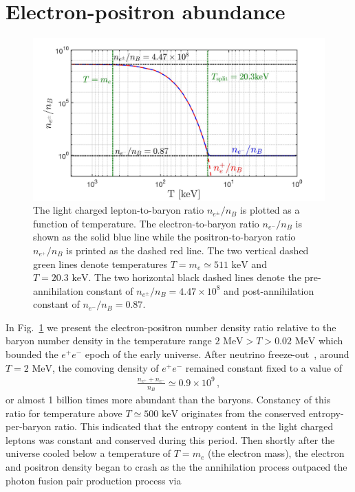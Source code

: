 \documentclass[a4paper]{article}
\newcommand*{\MeV}{\text{ MeV}}
\newcommand*{\keV}{\text{ keV}}
\newcommand{\rf}[1]{Fig.~{\ref{#1}}}
\begin{document}
\section{Electron-positron abundance}\label{sec:abundance}
\begin{figure}[h]
    \centering
    \includegraphics[width=\textwidth]{EEPlasmaDensityRatio.jpg}
    \caption{The light charged lepton-to-baryon ratio $n_{e^{\pm}}/n_{B}$ is plotted as a function of temperature. The electron-to-baryon ratio $n_{e^{-}}/n_{B}$ is shown as the solid blue line while the positron-to-baryon ratio $n_{e^{+}}/n_{B}$ is printed as the dashed red line. The two vertical dashed green lines denote temperatures $T=m_{e}\simeq511\keV$ and $T=20.3\keV$. The two horizontal black dashed lines denote the pre-annihilation constant of $n_{e^{\pm}}/n_{B}=4.47\times10^{8}$ and post-annihilation constant of $n_{e^{-}}/n_{B}=0.87$.}
    \label{DensityRatio} 
\end{figure}
\noindent In \rf{DensityRatio} we present the electron-positron number density ratio relative to the baryon number density in the temperature range $2\MeV>T>0.02\MeV$ which bounded the $e^{+}e^{-}$ epoch of the early universe. After neutrino freeze-out~\cite{birrell2014relic}, around $T=2\MeV$, the comoving density of $e^{+}e^{-}$ remained constant fixed to a value of 
\begin{align}
    \frac{n_{e^{+}}+n_{e^{-}}}{n_{B}}\simeq0.9\times10^{9}\,,
\end{align}
or almost 1 billion times more abundant than the baryons. Constancy of this ratio for temperature above $T\simeq500\keV$ originates from the conserved entropy-per-baryon ratio. This indicated that the entropy content in the light charged leptons was constant and conserved during this period. Then shortly after the universe cooled below a temperature of $T=m_{e}$ (the electron mass), the electron and positron density began to crash as the the annihilation process outpaced the photon fusion pair production process via
\end{document}
